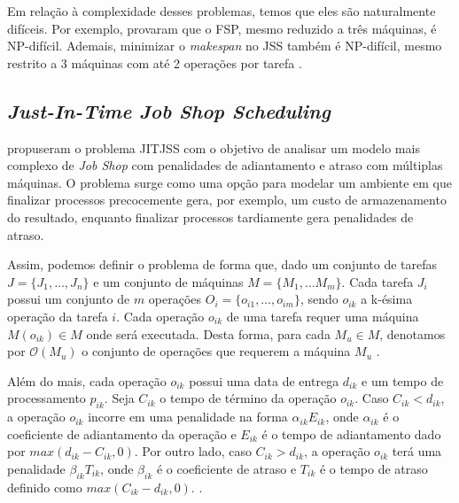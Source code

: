 Em relação à complexidade desses problemas, temos que eles são naturalmente difíceis. Por exemplo, \cite{garey1976complexity} provaram que o \ac{FSP}, mesmo reduzido a três máquinas, é NP-difícil. Ademais, minimizar o \textit{makespan} no \ac{JSS} também é NP-difícil, mesmo restrito a 3 máquinas com até 2 operações por tarefa \citep{lawler1993sequencing}.

\subsection{\textit{Just-In-Time Job Shop Scheduling}}

\cite{baptiste2008lagrangian} propuseram o problema \ac{JITJSS} com o objetivo de analisar um modelo mais complexo de \textit{Job Shop} com penalidades de adiantamento e atraso com múltiplas máquinas. O problema surge como uma opção para modelar um ambiente em que finalizar processos precocemente gera, por exemplo, um custo de armazenamento do resultado, enquanto finalizar processos tardiamente gera penalidades de atraso.

Assim, podemos definir o problema de forma que, dado um conjunto de tarefas $J=\{J_1,\ldots,J_n\}$ e um conjunto de máquinas $M=\{M_1,\ldots M_m\}$. Cada tarefa $J_i$ possui um conjunto de $m$ operações $O_i=\{o_{i1},\ldots,o_{im}\}$, sendo $o_{ik}$ a k-ésima operação da tarefa $i$. Cada operação $o_{ik}$ de uma tarefa requer uma máquina $M\left(o_{ik}\right) \in M$ onde será executada. Desta forma, para cada $M_u\in M$, denotamos por $\mathcal{O}\left(M_u\right)$ o conjunto de operações que requerem a máquina $M_u$ \citep{baptiste2008lagrangian}.

Além do mais, cada operação $o_{ik}$ possui uma data de entrega $d_{ik}$ e um tempo de processamento $p_{ik}$. Seja $C_{ik}$ o tempo de término da operação $o_{ik}$. Caso $C_{ik}<d_{ik}$, a operação $o_{ik}$ incorre em uma penalidade na forma $\alpha_{ik}E_{ik}$, onde $\alpha_{ik}$ é o coeficiente de adiantamento da operação e $E_{ik}$ é o tempo de adiantamento dado por $max\left(d_{ik}-C_{ik},0\right)$. Por outro lado, caso $C_{ik}>d_{ik}$, a operação $o_{ik}$ terá uma penalidade $\beta_{ik}T_{ik}$, onde $\beta_{ik}$ é o coeficiente de atraso e $T_{ik}$ é o tempo de atraso definido como $max\left(C_{ik}-d_{ik},0\right)$. \citep{baptiste2008lagrangian}.

